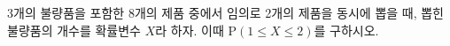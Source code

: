 3개의 불량품을 포함한 8개의 제품 중에서 임의로 2개의 제품을 동시에 뽑을 때, 뽑힌 불량품의 개수를 확률변수 $X$라 하자. 이때 $\mathrm{P}(1\le X\le 2)$를 구하시오.
